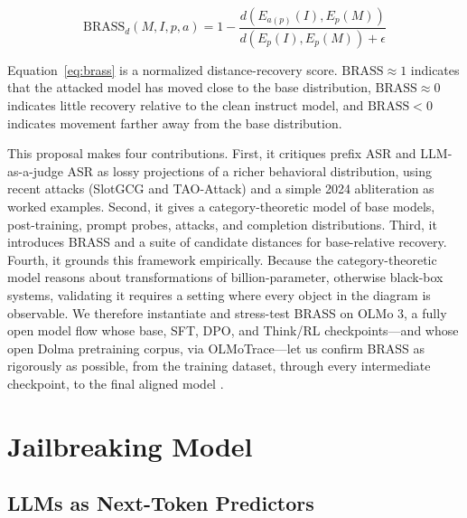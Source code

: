 \documentclass[conference]{IEEEtran}
\newcommand{\BRASS}{\mathrm{BRASS}}
\begin{document}
\begin{tcolorbox}[colback=white,colframe=black,title={Base Relative Attack Success Score}]
\begin{equation}
\boxed{
\BRASS_d(M,I,p,a)
=
1 -
\frac{
d(E_{a(p)}(I),E_p(M))
}{
d(E_p(I),E_p(M))+\epsilon
}
}
\label{eq:brass}
\end{equation}
\end{tcolorbox}

Equation~\eqref{eq:brass} is a normalized distance-recovery score. \(\BRASS\approx 1\) indicates that the attacked model has moved close to the base distribution, \(\BRASS\approx 0\) indicates little recovery relative to the clean instruct model, and \(\BRASS<0\) indicates movement farther away from the base distribution.

This proposal makes four contributions. First, it critiques prefix ASR and LLM-as-a-judge ASR as lossy projections of a richer behavioral distribution, using recent attacks (SlotGCG and TAO-Attack) and a simple 2024 abliteration as worked examples. Second, it gives a category-theoretic model of base models, post-training, prompt probes, attacks, and completion distributions. Third, it introduces BRASS and a suite of candidate distances for base-relative recovery. Fourth, it grounds this framework empirically. Because the category-theoretic model reasons about transformations of billion-parameter, otherwise black-box systems, validating it requires a setting where every object in the diagram is observable. We therefore instantiate and stress-test BRASS on OLMo 3, a fully open model flow whose base, SFT, DPO, and Think/RL checkpoints---and whose open Dolma pretraining corpus, via OLMoTrace---let us confirm BRASS as rigorously as possible, from the training dataset, through every intermediate checkpoint, to the final aligned model \cite{olmo3,soldaini2024dolma,olmotrace2024}.

\section{Jailbreaking Model}

\subsection{LLMs as Next-Token Predictors}
\end{document}
